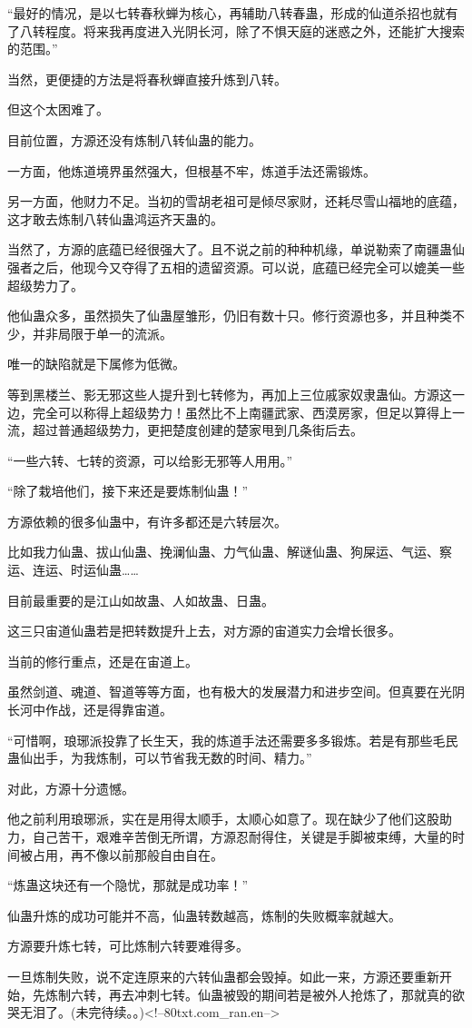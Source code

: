 \begin{this_body}
“最好的情况，是以七转春秋蝉为核心，再辅助八转春蛊，形成的仙道杀招也就有了八转程度。将来我再度进入光阴长河，除了不惧天庭的迷惑之外，还能扩大搜索的范围。”

当然，更便捷的方法是将春秋蝉直接升炼到八转。

但这个太困难了。

目前位置，方源还没有炼制八转仙蛊的能力。

一方面，他炼道境界虽然强大，但根基不牢，炼道手法还需锻炼。

另一方面，他财力不足。当初的雪胡老祖可是倾尽家财，还耗尽雪山福地的底蕴，这才敢去炼制八转仙蛊鸿运齐天蛊的。

当然了，方源的底蕴已经很强大了。且不说之前的种种机缘，单说勒索了南疆蛊仙强者之后，他现今又夺得了五相的遗留资源。可以说，底蕴已经完全可以媲美一些超级势力了。

他仙蛊众多，虽然损失了仙蛊屋雏形，仍旧有数十只。修行资源也多，并且种类不少，并非局限于单一的流派。

唯一的缺陷就是下属修为低微。

等到黑楼兰、影无邪这些人提升到七转修为，再加上三位戚家奴隶蛊仙。方源这一边，完全可以称得上超级势力！虽然比不上南疆武家、西漠房家，但足以算得上一流，超过普通超级势力，更把楚度创建的楚家甩到几条街后去。

“一些六转、七转的资源，可以给影无邪等人用用。”

“除了栽培他们，接下来还是要炼制仙蛊！”

方源依赖的很多仙蛊中，有许多都还是六转层次。

比如我力仙蛊、拔山仙蛊、挽澜仙蛊、力气仙蛊、解谜仙蛊、狗屎运、气运、察运、连运、时运仙蛊……

目前最重要的是江山如故蛊、人如故蛊、日蛊。

这三只宙道仙蛊若是把转数提升上去，对方源的宙道实力会增长很多。

当前的修行重点，还是在宙道上。

虽然剑道、魂道、智道等等方面，也有极大的发展潜力和进步空间。但真要在光阴长河中作战，还是得靠宙道。

“可惜啊，琅琊派投靠了长生天，我的炼道手法还需要多多锻炼。若是有那些毛民蛊仙出手，为我炼制，可以节省我无数的时间、精力。”

对此，方源十分遗憾。

他之前利用琅琊派，实在是用得太顺手，太顺心如意了。现在缺少了他们这股助力，自己苦干，艰难辛苦倒无所谓，方源忍耐得住，关键是手脚被束缚，大量的时间被占用，再不像以前那般自由自在。

“炼蛊这块还有一个隐忧，那就是成功率！”

仙蛊升炼的成功可能并不高，仙蛊转数越高，炼制的失败概率就越大。

方源要升炼七转，可比炼制六转要难得多。

一旦炼制失败，说不定连原来的六转仙蛊都会毁掉。如此一来，方源还要重新开始，先炼制六转，再去冲刺七转。仙蛊被毁的期间若是被外人抢炼了，那就真的欲哭无泪了。(未完待续。。)<!--80txt.com\_ran.en-->

\end{this_body}


